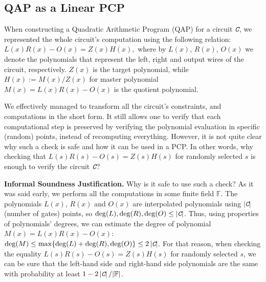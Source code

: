 \documentclass[../lecture-notes-148x210.tex]{subfiles}
\begin{document}
\subsection{QAP as a Linear PCP}

When constructing a Quadratic Arithmetic Program (QAP) for a circuit $\textit{\texttt{C}}$, we represented the whole circuit's 
computation using the following relation:
$
    L(x)R(x) - O(x) = Z(x)H(x),
$
where by $L(x)$, $R(x)$, $O(x)$ we denote the polynomials that represent the left, right and output 
wires of the circuit, respectively. $Z(x)$ is the target polynomial, while
$H(x) := M(x)\big/Z(x)$ for master polynomial $M(x) = L(x)R(x) - O(x)$ is the quotient polynomial.

We effectively managed to transform all the circuit's constraints, and computations in the short form.
It still allows one to verify that each computational step is preserved by verifying the 
polynomial evaluation in specific (random) points, instead of recomputing everything. However, it is 
not quite clear why such a check is safe and how it can be used in a PCP. In other words, why checking that $L(s)R(s)-O(s)=Z(s)H(s)$ for randomly selected $s$ is enough to verify the circuit $\textit{\texttt{C}}$?

\textbf{Informal Soundness Justification.} Why is it safe to use such a check? As it was
said early, we perform all the computations in some finite field $\mathbb{F}$.
The polynomials $L(x)$, $R(x)$ and $O(x)$ are interpolated polynomials using
$\left| \textit{\texttt{C}} \right|$ (number of gates) points, so $\deg(L), \deg(R), \deg(O)
\leq \left|\textit{\texttt{C}}\right|$. Thus, using properties of polynomials' degrees, we can
estimate the degree of polynomial $M(x) = L(x)R(x) - O(x)$: $\deg(M) \leq
\max\{\deg(L) + \deg(R), \deg(O)\} \leq 2 \left| \textit{\texttt{C}} \right|$. For that
reason, when checking the equality $L(s)R(s)-O(s)=Z(s)H(s)$ for randomly
selected $s$, we can be sure that the left-hand side and right-hand side
polynomials are the same with probability at least
$1-2\left|\textit{\texttt{C}}\right|/|\mathbb{F}|$.
\end{document}
